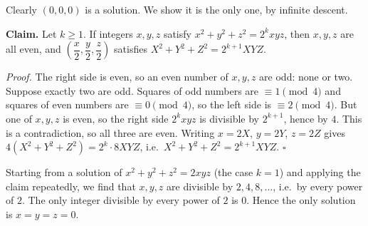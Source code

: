 Clearly $(0,0,0)$ is a solution. We show it is the only one, by infinite descent.

\textbf{Claim.} Let $k\ge1$. If integers $x,y,z$ satisfy $x^2+y^2+z^2=2^kxyz$, then $x,y,z$ are all even, and $\left(\dfrac {x}{2},\dfrac {y}{2},\dfrac {z}{2}\right)$ satisfies $X^2+Y^2+Z^2=2^{k+1}XYZ$.

\emph{Proof.} The right side is even, so an even number of $x,y,z$ are odd: none or two. Suppose exactly two are odd. Squares of odd numbers are $\equiv1\pmod4$ and squares of even numbers are $\equiv0\pmod4$, so the left side is $\equiv2\pmod4$. But one of $x,y,z$ is even, so the right side $2^kxyz$ is divisible by $2^{k+1}$, hence by $4$. This is a contradiction, so all three are even. Writing $x=2X$, $y=2Y$, $z=2Z$ gives $4(X^2+Y^2+Z^2)=2^k\cdot8XYZ$, i.e.\ $X^2+Y^2+Z^2=2^{k+1}XYZ$. $\square$

Starting from a solution of $x^2+y^2+z^2=2xyz$ (the case $k=1$) and applying the claim repeatedly, we find that $x,y,z$ are divisible by $2,4,8,\dots$, i.e.\ by every power of $2$. The only integer divisible by every power of $2$ is $0$. Hence the only solution is $\boxed{x=y=z=0}$.
